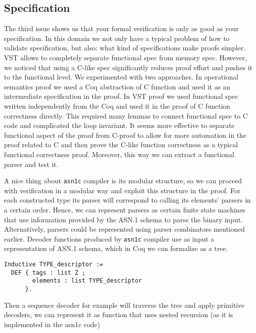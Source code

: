 \documentclass[acmsmall,nonacm]{acmart}
\begin{document}
\subsection{Specification}

The third issue shows us that your formal verification is only as good as your specification. In this domain we not only have a typical problem of how to validate specification, but also: what kind of specifications make proofs simpler. VST allows to completely separate functional spec from memory spec. However, we noticed that using a C-like spec significantly reduces proof effort and pushes it to the functional level. We experimented with two approaches. In operational semantics proof we used a Coq abstraction of C function and used it as an intermediate specification in the proof. In VST proof we used functional spec written independently from the Coq and used it in the proof of C function correctness directly. This required many lemmas to connect functional spec to C code and complicated the loop invariant. It seems more effective to separate functional aspect of the proof from C-proof to allow for more automation in the proof related to C and then prove the C-like function correctness as a typical functional correctness proof. Moreover, this way we can extract a functional parser and test it.

A nice thing about \texttt{asn1c} compiler is its modular structure, so we can proceed with verification in a modular way and exploit this structure in the proof. For each constructed type its parser will correspond to calling its elements' parsers in a certain order. Hence, we can represent parsers as certain finite state machines that use information provided by the ASN.1 schema to parse the binary input. Alternatively, parsers could be represented using parser combinators mentioned earlier. Decoder functions produced by \texttt{asn1c} compiler use as input a representation of ASN.1 schema, which in Coq we can formalize as a tree.

 \begin{lstlisting}[language=Coq]
Inductive TYPE_descriptor :=
  DEF { tags : list Z ;
        elements : list TYPE_descriptor 
      }.
 \end{lstlisting}

Then a sequence decoder for example will traverse the tree and apply primitive decoders, we can represent it as function that uses nested recursion (as it is implemented in the asn1c code)
 
\end{document}
